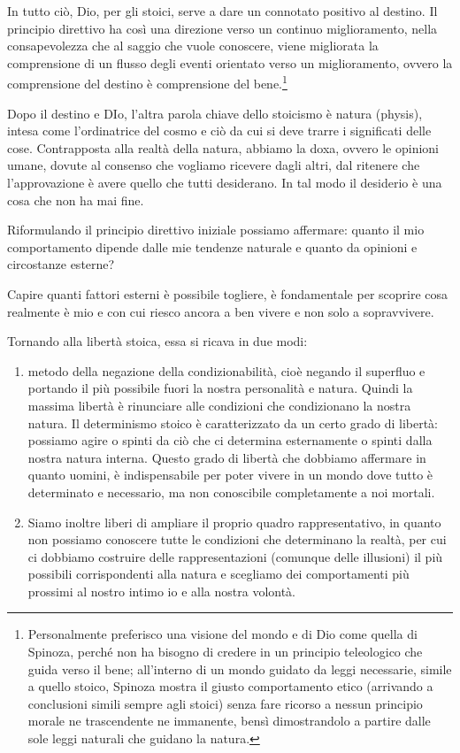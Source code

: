 \documentclass[a4paper,12pt,oneside]{article}%
\begin{document}
In tutto ciò,  Dio, per gli stoici, serve a dare un connotato positivo al destino. Il principio direttivo ha così una direzione verso un continuo miglioramento, nella consapevolezza che al saggio che vuole conoscere, viene migliorata la comprensione di un flusso degli eventi orientato verso un miglioramento, ovvero la comprensione del destino è comprensione del bene.\footnote{Personalmente preferisco una visione del mondo e di Dio come quella di Spinoza, perché non ha bisogno di credere in un principio teleologico che guida verso il bene; all'interno di un mondo guidato da leggi necessarie, simile a quello stoico, Spinoza mostra il giusto comportamento etico (arrivando a conclusioni simili sempre agli stoici) senza fare ricorso a nessun principio morale ne trascendente ne immanente, bensì dimostrandolo a partire dalle sole leggi naturali che guidano la natura. }

Dopo il destino e DIo, l'altra parola chiave dello stoicismo è natura (physis), intesa come l'ordinatrice del cosmo e ciò da cui si deve trarre i significati delle cose. Contrapposta alla realtà della natura, abbiamo la doxa, ovvero le opinioni umane, dovute al consenso che vogliamo ricevere dagli altri, dal ritenere che l'approvazione è avere quello che tutti desiderano. In tal modo il desiderio è una cosa che non ha mai fine.

Riformulando il principio direttivo iniziale possiamo affermare: quanto il mio comportamento dipende dalle mie tendenze naturale e quanto da opinioni e circostanze esterne?

Capire quanti fattori esterni è possibile togliere, è fondamentale per scoprire cosa realmente è mio e con cui riesco ancora a ben vivere e non solo a sopravvivere.

Tornando alla libertà stoica, essa si ricava in due modi:

\begin{enumerate}
	\item metodo della negazione della condizionabilità, cioè negando il superfluo e portando il più possibile fuori la nostra personalità e natura. Quindi la massima libertà è rinunciare alle condizioni che condizionano la nostra natura. Il determinismo stoico  è caratterizzato da un certo grado di libertà: possiamo agire o spinti da ciò che ci determina esternamente o spinti dalla nostra natura interna. Questo grado di libertà che dobbiamo affermare in quanto uomini, è indispensabile per poter vivere in un mondo dove tutto è determinato e necessario, ma non conoscibile completamente a noi mortali.
	
	\item Siamo inoltre liberi di ampliare il proprio quadro rappresentativo, in quanto non possiamo conoscere tutte le condizioni che determinano la realtà, per cui ci dobbiamo costruire delle  rappresentazioni (comunque delle illusioni) il più possibili corrispondenti alla natura e scegliamo dei comportamenti più prossimi al nostro intimo io e alla nostra volontà. 
\end{enumerate}
\end{document}
